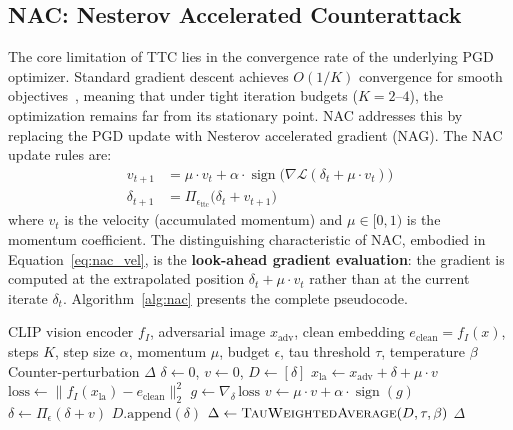 \documentclass[12pt,a4paper]{article}
\begin{document}
\subsection{NAC: Nesterov Accelerated Counterattack}

The core limitation of TTC lies in the convergence rate of the underlying PGD optimizer. Standard gradient descent achieves $O(1/K)$ convergence for smooth objectives~\cite{nesterov1983method}, meaning that under tight iteration budgets ($K=2$--$4$), the optimization remains far from its stationary point. NAC addresses this by replacing the PGD update with Nesterov accelerated gradient (NAG). The NAC update rules are:
\begin{align}
v_{t+1} &= \mu \cdot v_t + \alpha \cdot \operatorname{sign}\!\big(\nabla \mathcal{L}(\delta_t + \mu \cdot v_t)\big) \label{eq:nac_vel} \\
\delta_{t+1} &= \Pi_{\epsilon_{\text{ttc}}}\!\big(\delta_t + v_{t+1}\big) \label{eq:nac_update}
\end{align}
where $v_t$ is the velocity (accumulated momentum) and $\mu \in [0, 1)$ is the momentum coefficient. The distinguishing characteristic of NAC, embodied in Equation~\ref{eq:nac_vel}, is the \textbf{look-ahead gradient evaluation}: the gradient is computed at the extrapolated position $\delta_t + \mu \cdot v_t$ rather than at the current iterate $\delta_t$. Algorithm~\ref{alg:nac} presents the complete pseudocode.

\begin{algorithm}[ht]
\caption{NAC: Nesterov Accelerated Counterattack}\label{alg:nac}
\begin{algorithmic}[1]
\Require CLIP vision encoder $f_I$, adversarial image $x_{\text{adv}}$, clean embedding $e_{\text{clean}}=f_I(x)$, steps $K$, step size $\alpha$, momentum $\mu$, budget $\epsilon$, tau threshold $\tau$, temperature $\beta$
\Ensure Counter-perturbation $\Delta$
\State $\delta \leftarrow 0$, $v \leftarrow 0$, $D \leftarrow [\delta]$
    \State $x_{\text{la}} \leftarrow x_{\text{adv}} + \delta + \mu \cdot v$ 
    \State $\text{loss} \leftarrow \big\|f_I(x_{\text{la}}) - e_{\text{clean}}\big\|^2_2$
    \State $g \leftarrow \nabla_\delta \,\text{loss}$
    \State $v \leftarrow \mu \cdot v + \alpha \cdot \operatorname{sign}(g)$ 
    \State $\delta \leftarrow \Pi_{\epsilon}(\delta + v)$
    \State $D.\text{append}(\delta)$
\EndFor
\State $\Delta \leftarrow \textsc{TauWeightedAverage}(D, \tau, \beta)$
\State \Return $\Delta$
\end{algorithmic}
\end{algorithm}
\end{document}
